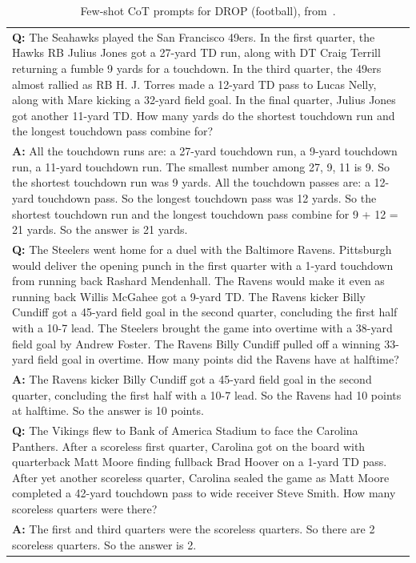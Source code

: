 \documentclass{article} %
\begin{document}
\begin{table}[h]
    \caption{
    Few-shot CoT prompts for DROP (football), from~\cite{Zhou2022LeasttoMostPE}.
    }
    \centering
    \small
    \begin{tabular}{p{13.5cm}}
        \toprule
        \textbf{Q:} The Seahawks played the San Francisco 49ers. In the first quarter, the Hawks RB Julius Jones got a 27-yard TD run, along with DT Craig Terrill returning a fumble 9 yards for a touchdown. In the third quarter, the 49ers almost rallied as RB H. J. Torres made a 12-yard TD pass to Lucas Nelly, along with Mare kicking a 32-yard field goal. In the final quarter, Julius Jones got another 11-yard TD. How many yards do the shortest touchdown run and the longest touchdown pass combine for? \\
        \vspace{-1mm}
        \textbf{A:} All the touchdown runs are: a 27-yard touchdown run, a 9-yard touchdown run, a 11-yard touchdown run. The smallest number among 27, 9, 11 is 9. So the shortest touchdown run was 9 yards. All the touchdown passes are: a 12-yard touchdown pass. So the longest touchdown pass was 12 yards. So the shortest touchdown run and the longest touchdown pass combine for 9 + 12 = 21 yards. So the answer is 21 yards. \\
        \vspace{0mm}
        \textbf{Q:} The Steelers went home for a duel with the Baltimore Ravens. Pittsburgh would deliver the opening punch in the first quarter with a 1-yard touchdown from running back Rashard Mendenhall. The Ravens would make it even as running back Willis McGahee got a 9-yard TD. The Ravens kicker Billy Cundiff got a 45-yard field goal in the second quarter, concluding the first half with a 10-7 lead. The Steelers brought the game into overtime with a 38-yard field goal by Andrew Foster. The Ravens Billy Cundiff pulled off a winning 33-yard field goal in overtime. How many points did the Ravens have at halftime? \\
        \vspace{-1mm}
        \textbf{A:} The Ravens kicker Billy Cundiff got a 45-yard field goal in the second quarter, concluding the first half with a 10-7 lead.  So the Ravens had 10 points at halftime. So the answer is 10 points. \\
        \vspace{0mm}
        \textbf{Q:} The Vikings flew to Bank of America Stadium to face the Carolina Panthers. After a scoreless first quarter, Carolina got on the board with quarterback Matt Moore finding fullback Brad Hoover on a 1-yard TD pass. After yet another scoreless quarter, Carolina sealed the game as Matt Moore completed a 42-yard touchdown pass to wide receiver Steve Smith. How many scoreless quarters were there? \\
        \vspace{-1mm}
        \textbf{A:} The first and third quarters were the scoreless quarters. So there are 2 scoreless quarters. So the answer is 2. \\
        \bottomrule
    \end{tabular}
    \label{tab:prompt-dropf}
\end{table}
\end{document}
